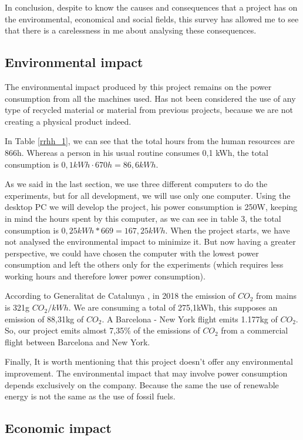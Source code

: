\documentclass[titlepage,12pt]{report}
\begin{document}
In conclusion, despite to know the causes and consequences that a project has on the environmental, economical and social fields, this survey has allowed me to see that there is a carelessness in me about analysing these consequences.

\subsection{Environmental impact}

The environmental impact produced by this project remains on the power consumption from all the machines used. Has not been considered the use of any type of recycled material or material from previous projects, because we are not creating a physical product indeed.

In Table \ref{rrhh_1}, we can see that the total hours from the human resources are 866h. Whereas a person in his usual routine consumes 0,1 kWh, the total consumption is $0,1kWh \cdot 670h = 86,6kWh$.

As we said in the last section, we use three different computers to do the experiments, but for all development, we will use only one computer. Using the desktop PC we will develop the project, his power consumption is 250W, keeping in mind the hours spent by this computer, as we can see in table 3, the total consumption is $0,25 kWh * 669 = 167,25kWh$. When the project starts, we have not analysed the environmental impact to minimize it. But now having a greater perspective, we could have chosen the computer with the lowest power consumption and left the others only for the experiments (which requires less working hours and therefore lower power consumption).

According to Generalitat de Catalunya \citep{gene}, in 2018 the emission of $CO_{2}$ from mains is 321g $CO_{2}/kWh$. We are consuming a total of 275,1kWh, this supposes an emission of 88,31kg of $CO_{2}$. A Barcelona - New York flight emits 1.177kg of $CO_{2}$. So, our project emits almost 7,35\% of the emissions of $CO_{2}$ from a commercial flight between Barcelona and New York.

Finally, It is worth mentioning that this project doesn't offer any environmental improvement. The environmental impact that may involve power consumption depends exclusively on the company. Because the same the use of renewable energy is not the same as the use of fossil fuels.

\subsection{Economic impact}
\end{document}
